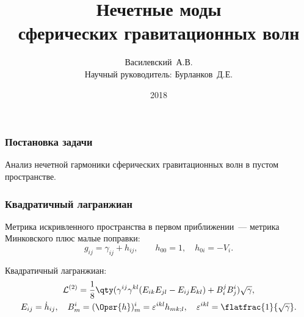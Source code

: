 \documentclass[compress]{beamer}
\title{Нечетные моды\\ сферических гравитационных волн}
\author[Василевский~А.В.]{
    Василевский~А.В. \\[\baselineskip]
    {\footnotesize Научный руководитель: Бурланков~Д.Е.}
}
\institute[ННГУ]{Нижегородский университет им. Н.И.~Лобачевского}
\date{2018}
\begin{document}

    \frame[plain]{\titlepage}


    \begin{frame}\frametitle{Постановка задачи}

        Анализ нечетной гармоники сферических гравитационных волн в пустом пространстве.

    \end{frame}


    \begin{frame}\frametitle{Квадратичный лагранжиан}

        Метрика искривленного пространства в первом приближении~--- метрика Минковского плюс малые поправки:
        \begin{equation*}
            g_{ij} = \gamma_{ij} + h_{ij}, \qquad h_{00} = 1, \quad h_{0i} = -V_i .
        \end{equation*}

        Квадратичный лагранжиан:
        \begin{equation}\begin{gathered}\label{eq:lagr}
            \mathcal{L}^{(2)} = \frac{1}{8} \qty(
                \gamma^{ij}\gamma^{kl} (E_{ik}E_{jl} - E_{ij}E_{kl}) + B_i^j B_j^i
            ) \sqrt{\gamma} , \\
            E_{ij} = \dot{h}_{ij}, \quad
            B^i_m = (\Opsr{h})^i_m = \varepsilon^{ikl} h_{mk;l}, \quad
            \varepsilon^{ikl} = \flatfrac{1}{\sqrt{\gamma}}.
        \end{gathered}\end{equation}

    \end{frame}
\end{document}
